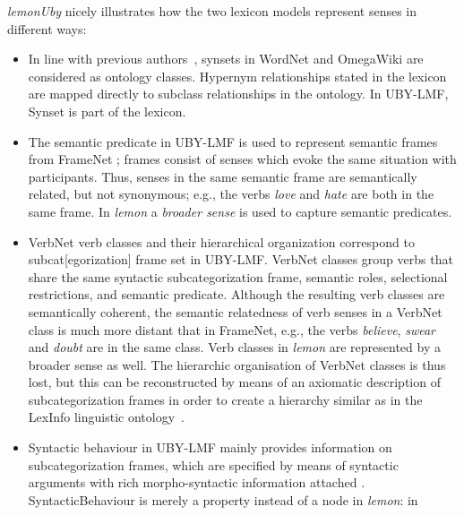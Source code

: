 \emph{lemonUby} nicely illustrates how the two lexicon models represent senses in different ways:
\begin{itemize}
\item In line with previous authors~\cite{mccrae2012integrating}, synsets in
  WordNet and OmegaWiki are considered as ontology classes. Hypernym
  relationships stated in the lexicon are mapped directly to subclass
  relationships in the ontology. In UBY-LMF, Synset is part of the lexicon.
\item The semantic predicate in UBY-LMF is used to represent semantic frames from 
  FrameNet \cite{TUD-CS-2013-0003}; frames consist of senses which evoke the same situation with participants. 
  Thus, senses in the same semantic frame are semantically related, but not synonymous; 
  e.g., the verbs {\em love} and {\em hate} are both in the same frame. %
In \emph{lemon} a 
{\em broader sense} is used to capture semantic predicates.
\item VerbNet verb classes and their hierarchical organization correspond to  
  subcat[egorization] frame set in UBY-LMF. VerbNet classes group verbs that
share the same syntactic subcategorization frame, semantic roles, selectional
restrictions, and semantic predicate. Although the resulting verb classes are
semantically coherent, the semantic relatedness of verb senses in a VerbNet class is much more
distant that in FrameNet, e.g., the verbs {\em believe}, {\em swear} and {\em doubt} are in the same class.
Verb classes in \emph{lemon} are represented by a broader sense as well.
The hierarchic organisation of VerbNet classes is thus lost, but this can be
reconstructed by means of an axiomatic description of subcategorization frames in
order to create a hierarchy similar as in the LexInfo linguistic
ontology~\cite{mccrae2011linking}.
\item Syntactic behaviour in UBY-LMF mainly provides information on
subcategorization frames, which are specified by means of syntactic arguments
with rich morpho-syntactic information attached
\cite{TUD-CS-2012-0024}.
SyntacticBehaviour is merely a property instead of a node in \emph{lemon}: in 

\end{itemize}
